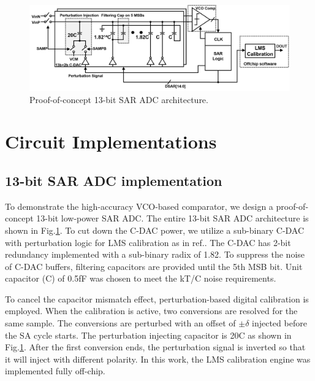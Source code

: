\documentclass[journal]{IEEEtran}
\begin{document}
\begin{figure}[!]
\centering
 \includegraphics[width=1\textwidth]{figs/fig7.png}
  \caption{Proof-of-concept 13-bit SAR ADC architecture.}
  \label{13bsar}
\end{figure}

\section{Circuit Implementations}

\subsection{13-bit SAR ADC implementation}
To demonstrate the high-accuracy VCO-based comparator, we design a proof-of-concept 13-bit low-power SAR ADC.
The entire 13-bit SAR ADC architecture is shown in Fig.\ref{13bsar}. To cut down the C-DAC power, we utilize a sub-binary C-DAC with perturbation logic for LMS calibration as in ref.\cite{liu201012b}. The C-DAC has 2-bit redundancy implemented with a sub-binary radix of 1.82. To suppress the noise of C-DAC buffers, filtering capacitors\cite{miki20154} are provided until the 5th MSB bit. Unit capacitor (C) of 0.5fF was chosen to meet the kT/C noise requirements.

To cancel the capacitor mismatch effect, perturbation-based digital calibration\cite{liu201012b} is employed. When the calibration is active, two conversions are resolved for the same sample. The conversions are perturbed with an offset of $\pm \delta$ injected before the SA cycle starts. The perturbation injecting capacitor is 20C as shown in Fig.\ref{13bsar}. After the first conversion ends, the perturbation signal is inverted so that it will inject with different polarity. In this work, the LMS calibration engine was implemented fully off-chip.
\end{document}
